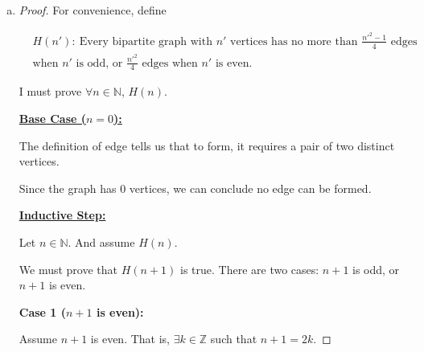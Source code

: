 \documentclass[12pt]{article}
\begin{document}
\begin{enumerate}[a.]




    \item

    \bigskip

    \begin{proof}
        For convenience, define

        \begin{align*}
        & H(n'):\:\text{Every bipartite graph with $n'$ vertices has no more than
        $\frac{n'^2-1}{4}$ edges}\\
        & \text{when $n'$ is odd, or $\frac{n'^2}{4}$ edges when $n'$ is even.}
        \end{align*}

        \bigskip

        I must prove $\forall n \in \mathbb{N}$, $H(n)$.

        \bigskip

        \underline{\textbf{Base Case ($n = 0$):}}

        \bigskip

        The definition of edge tells us that to form, it requires a pair of two
        distinct vertices.

        \bigskip

        Since the graph has 0 vertices, we can conclude no edge can be
        formed.

        \bigskip

        \underline{\textbf{Inductive Step:}}

        \bigskip

        Let $n \in \mathbb{N}$. And assume $H(n)$.

        \bigskip

        We must prove that $H(n+1)$ is true. There are two cases: $n+1$ is odd, or
        $n+1$ is even.

        \bigskip

        \textbf{Case 1 ($n+1$ is even):}

        \bigskip

        Assume $n+1$ is even. That is, $\exists k \in \mathbb{Z}$ such that
        $n+1 = 2k$.


\end{proof}
\end{enumerate}
\end{document}

